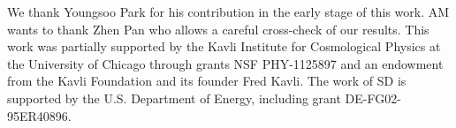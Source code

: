 \documentclass[aps,prd,reprint,superscriptaddress]{revtex4-1}
\begin{document}


\begin{acknowledgments}
We thank Youngsoo Park for his contribution in the early stage of this work.
AM wants to thank Zhen Pan who allows a careful cross-check of our results.
This work was partially supported by the Kavli Institute for Cosmological Physics at the University of Chicago through grants NSF PHY-1125897 and an endowment from the Kavli Foundation and its founder Fred Kavli.
The work of SD is supported by the U.S. Department of Energy, including grant DE-FG02-95ER40896.
\end{acknowledgments}


\end{document}
